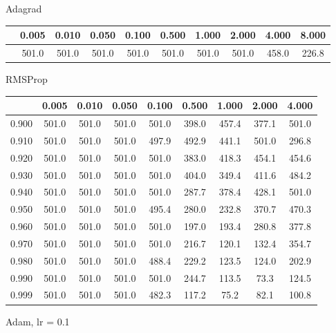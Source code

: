 \documentclass[a4paper,14pt,oneside,openany]{memoir}
\begin{document}
	Adagrad 
	
	\begin{tabular}{|c|c|c|c|c|c|c|c|c|c|}
	\hline 
	 &0.005 &0.010 &0.050 &0.100 &0.500 &1.000 &2.000 &4.000 &8.000 \\
	 \hline 
	 &501.0 &501.0 &501.0 &501.0 &501.0 &501.0 &501.0 &458.0 &226.8 \\
	 \hline 
	
	\end{tabular}
	
	RMSProp 
	
	\begin{tabular}{|c|c|c|c|c|c|c|c|c|}
	\hline 
	 &0.005 &0.010 &0.050 &0.100 &0.500 &1.000 &2.000 &4.000 \\
	 \hline 
	0.900 &501.0 &501.0 &501.0 &501.0 &398.0 &457.4 &377.1 &501.0 \\
	 \hline 
	0.910 &501.0 &501.0 &501.0 &497.9 &492.9 &441.1 &501.0 &296.8 \\
	 \hline 
	0.920 &501.0 &501.0 &501.0 &501.0 &383.0 &418.3 &454.1 &454.6 \\
	 \hline 
	0.930 &501.0 &501.0 &501.0 &501.0 &404.0 &349.4 &411.6 &484.2 \\
	 \hline 
	0.940 &501.0 &501.0 &501.0 &501.0 &287.7 &378.4 &428.1 &501.0 \\
	 \hline 
	0.950 &501.0 &501.0 &501.0 &495.4 &280.0 &232.8 &370.7 &470.3 \\
	 \hline 
	0.960 &501.0 &501.0 &501.0 &501.0 &197.0 &193.4 &280.8 &377.8 \\
	 \hline 
	0.970 &501.0 &501.0 &501.0 &501.0 &216.7 &120.1 &132.4 &354.7 \\
	 \hline 
	0.980 &501.0 &501.0 &501.0 &488.4 &229.2 &123.5 &124.0 &202.9 \\
	 \hline 
	0.990 &501.0 &501.0 &501.0 &501.0 &244.7 &113.5 &73.3 &124.5 \\
	 \hline 
	0.999 &501.0 &501.0 &501.0 &482.3 &117.2 &75.2 &82.1 &100.8 \\
	 \hline 
	
	\end{tabular}
	
	Adam, lr = 0.1 
	
\end{document}
